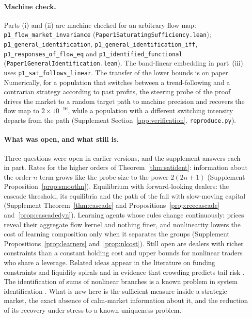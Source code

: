 \documentclass[12pt]{article}
\theoremstyle{definition}
\theoremstyle{remark}
\begin{document}
\paragraph{Machine check.} Parts (i) and (ii) are machine-checked for an arbitrary flow map: \texttt{p1\_flow\_market\_invariance} (\nolinkurl{Paper1SaturatingSufficiency.lean}); \texttt{p1\_general\_identification}, \texttt{p1\_general\_identification\_iff}, \texttt{p1\_responses\_of\_flow\_eq} and \texttt{p1\_identified\_functional} (\nolinkurl{Paper1GeneralIdentification.lean}). The band-linear embedding in part~(iii) uses \texttt{p1\_sat\_follows\_linear}. The transfer of the lower bounds is on paper. Numerically, for a population that switches between a trend-following and a contrarian strategy according to past profits, the steering probe of the proof drives the market to a random target path to machine precision and recovers the flow map to $2\times10^{-16}$, while a population with a different switching intensity departs from the path (Supplement Section~\ref{app:verification}, \nolinkurl{reproduce.py}).

\paragraph{What was open, and what still is.} Three questions were open in earlier versions, and the supplement answers each in part. Rates for the higher orders of Theorem~\ref{thm:satident}: information about the order-$n$ term grows like the probe size to the power $2(2n+1)$ (Supplement Proposition~\ref{prop:smoothn}). Equilibrium with forward-looking dealers: the cascade threshold, its equilibria and the path of the fall with slow-moving capital (Supplement Theorem~\ref{thm:cascade} and Propositions~\ref{prop:reecascade} and~\ref{prop:cascadedyn}). Learning agents whose rules change continuously: prices reveal their aggregate flow kernel and nothing finer, and nonlinearity lowers the cost of learning composition only when it separates the groups (Supplement Propositions~\ref{prop:learners} and~\ref{prop:nlcost}). Still open are dealers with richer constraints than a constant holding cost and upper bounds for nonlinear traders who share a leverage. Related ideas appear in the literature on funding constraints and liquidity spirals \citep{brunnermeier2009} and in evidence that crowding predicts tail risk \citep{barroso2022}. The identification of sums of nonlinear branches is a known problem in system identification \citep{dreesen2017}. What is new here is the sufficient measure inside a strategic market, the exact absence of calm-market information about it, and the reduction of its recovery under stress to a known uniqueness problem.
\end{document}

